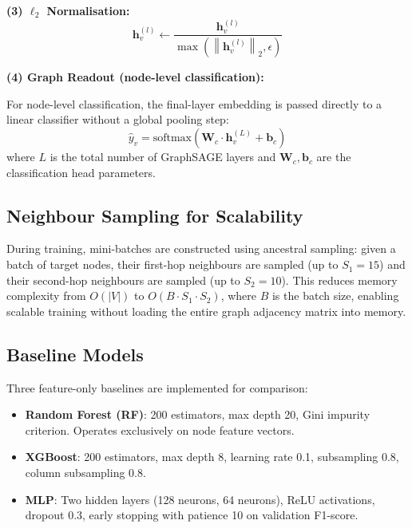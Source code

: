 \documentclass[conference]{IEEEtran}
\begin{document}
\textbf{(3) $\ell_2$ Normalisation:}
\begin{equation}
\mathbf{h}_v^{(l)} \leftarrow
\frac{\mathbf{h}_v^{(l)}}{\max\!\left(\left\|\mathbf{h}_v^{(l)}\right\|_2,
\epsilon\right)}
\label{eq:normalise}
\end{equation}

\textbf{(4) Graph Readout (node-level classification):}

For node-level classification, the final-layer embedding is passed directly to
a linear classifier without a global pooling step:
\begin{equation}
\hat{y}_v = \text{softmax}\!\left(\mathbf{W}_c \cdot \mathbf{h}_v^{(L)}
+ \mathbf{b}_c\right)
\label{eq:readout}
\end{equation}
where $L$ is the total number of GraphSAGE layers and
$\mathbf{W}_c, \mathbf{b}_c$ are the classification head parameters.

\subsection{Neighbour Sampling for Scalability}

During training, mini-batches are constructed using ancestral sampling: given a
batch of target nodes, their first-hop neighbours are sampled (up to $S_1 = 15$)
and their second-hop neighbours are sampled (up to $S_2 = 10$). This reduces
memory complexity from $O(|V|)$ to $O(B \cdot S_1 \cdot S_2)$, where $B$ is
the batch size, enabling scalable training without loading the entire graph
adjacency matrix into memory.

\subsection{Baseline Models}

Three feature-only baselines are implemented for comparison:
\begin{itemize}
    \item \textbf{Random Forest (RF)}: 200 estimators, max depth 20, Gini
    impurity criterion. Operates exclusively on node feature vectors.
    \item \textbf{XGBoost}: 200 estimators, max depth 8, learning rate 0.1,
    subsampling 0.8, column subsampling 0.8.
    \item \textbf{MLP}: Two hidden layers (128 neurons, 64 neurons), ReLU
    activations, dropout 0.3, early stopping with patience 10 on validation
    F1-score.
\end{itemize}
\end{document}
